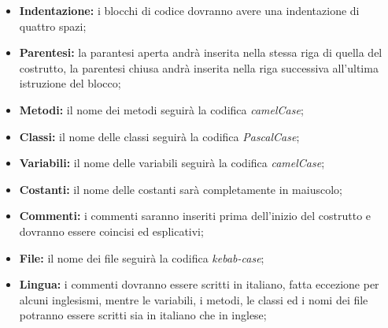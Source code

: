 \begin{itemize}
    \item \textbf{Indentazione:} i blocchi di codice dovranno avere una indentazione di quattro spazi;
    \item \textbf{Parentesi:} la parantesi aperta andrà inserita nella stessa riga di quella del costrutto, la parentesi chiusa andrà inserita nella riga successiva all'ultima istruzione del blocco;
    \item \textbf{Metodi:} il nome dei metodi seguirà la codifica \textit{camelCase};
    \item \textbf{Classi:} il nome delle classi seguirà la codifica \textit{PascalCase};
    \item \textbf{Variabili:} il nome delle variabili seguirà la codifica \textit{camelCase};
    \item \textbf{Costanti:} il nome delle costanti sarà completamente in maiuscolo;
    \item \textbf{Commenti:} i commenti saranno inseriti prima dell'inizio del costrutto e dovranno essere coincisi ed esplicativi;
    \item \textbf{File:} il nome dei file seguirà la codifica \textit{kebab-case};
    \item \textbf{Lingua:} i commenti dovranno essere scritti in italiano, fatta eccezione per alcuni inglesismi, mentre le variabili, i metodi, le classi ed i nomi dei file potranno essere scritti sia in italiano che in inglese;
\end{itemize}